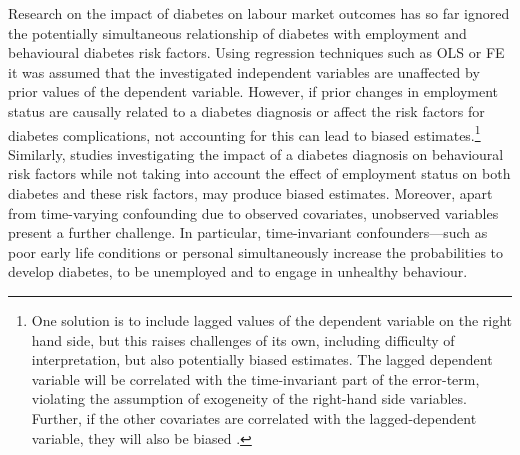 Research on the impact of diabetes on labour market outcomes has so far ignored the potentially simultaneous relationship of diabetes with employment and behavioural diabetes risk factors. Using regression techniques such as \ac{OLS} or \ac{FE} it was assumed that the investigated independent variables are unaffected by prior values of the dependent variable. However, if prior changes in employment status are causally related to a diabetes diagnosis or affect the risk factors for diabetes complications, not accounting for this can lead to biased estimates.\footnote{One solution is to include lagged values of the dependent variable on the right hand side, but this raises challenges of its own, including difficulty of interpretation, but also potentially biased estimates. The lagged dependent variable will be correlated with the time-invariant part of the error-term, violating the assumption of exogeneity of the right-hand side variables. Further, if the other covariates are correlated with the lagged-dependent variable, they will also be biased \parencite{Anderson1982,Nickell1981}.} Similarly, studies investigating the impact of a diabetes diagnosis on behavioural risk factors while not taking into account the effect of employment status on both diabetes and these risk factors, may produce biased estimates. Moreover, apart from time-varying confounding due to observed covariates, unobserved variables present a further challenge. In particular, time-invariant confounders---such as poor early life conditions or personal \DIFdelbegin {}\DIFdelend \DIFaddbegin {}\DIFaddend simultaneously increase the probabilities to develop diabetes, to be unemployed and to engage in unhealthy behaviour. 

